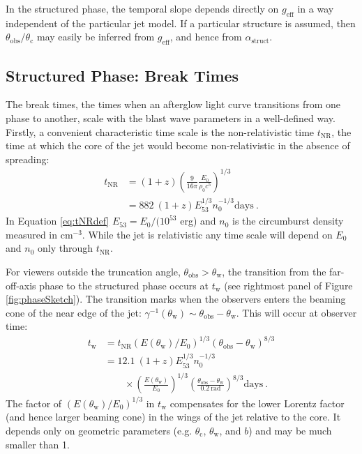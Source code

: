 \documentclass[twocolumn]{aastex62}
\newcommand{\tW}{\ensuremath{t_{\mathrm{w}}}}
\newcommand{\tNR}{\ensuremath{t_{\mathrm{NR}}}}
\newcommand{\thobs}{\ensuremath{\theta_{\mathrm{obs}}}}
\newcommand{\thW}{\ensuremath{\theta_{\mathrm{w}}}}
\newcommand{\thC}{\ensuremath{\theta_{\mathrm{c}}}}
\newcommand{\geff}{\ensuremath{g_{\mathrm{eff}}}}
\begin{document}
In the structured phase, the temporal slope depends directly on $\geff$ in a way independent of the particular jet model.  If a particular structure is assumed, then $\thobs/\thC$ may easily be inferred from $\geff$, and hence from $\alpha_{\mathrm{struct}}$.


\subsection{Structured Phase: Break Times}\label{subsec:structureBreak}

The break times, the times when an afterglow light curve transitions from one phase to another, scale with the blast wave parameters in a well-defined way. Firstly, a convenient characteristic time scale is the non-relativistic time $\tNR$, the time at which the core of the jet would become non-relativistic in the absence of spreading:
\begin{align}
	\tNR &= (1+z) \left( \frac{9}{16\pi} \frac{E_0}{\rho_0 c^5} \right)^{1/3}  \label{eq:tNRdef} \\
	&= 882 \ (1+z) E_{53}^{1/3}n_0^{-1/3} \mathrm{ days}\ . \nonumber
\end{align}
In Equation \eqref{eq:tNRdef} $E_{53} = E_0 / (10^{53}$ erg) and $n_0$ is the circumburst density measured in cm$^{-3}$.  While the jet is relativistic any time scale will depend on $E_0$ and $n_0$ only through $\tNR$.

For viewers outside the truncation angle, $\thobs > \thW$, the transition from the far-off-axis phase to the structured phase occurs at $\tW$ (see rightmost panel of Figure \ref{fig:phaseSketch}).  The transition marks when the observers enters the beaming cone of the near edge of the jet: $\gamma^{-1}(\thW) \sim \thobs-\thW$.  This will occur at observer time:
\begin{align}
	\tW &= \tNR \left(E(\thW) / E_0\right)^{1/3} \left( \thobs-\thW \right)^{8/3}  \label{eq:tw} \\
	&= 12.1 \ (1+z) E_{53}^{1/3} n_0^{-1/3} \nonumber \\
	& \qquad \times \left(\frac{E(\thW) }{ E_0}\right)^{1/3} \left( \frac{\thobs-\thW}{0.2\ \mathrm{ rad}} \right)^{8/3}  \mathrm{ days}\ .
\end{align}
The factor of $(E(\thW) / E_0)^{1/3}$ in $\tW$ compensates for the lower Lorentz factor (and hence larger beaming cone) in the wings of the jet relative to the core.  It depends only on geometric parameters (e.g. $\thC$, $\thW$, and $b$) and may be much smaller than 1.
\end{document}
